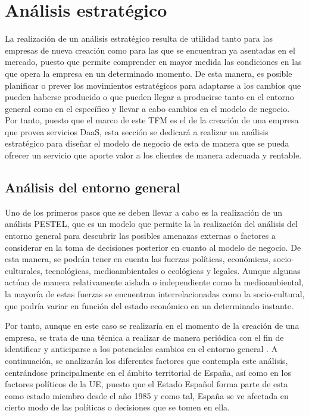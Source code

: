 \clearpage

\section{Análisis estratégico}
La realización de un análisis estratégico resulta de utilidad tanto para las empresas de nueva creación como para las que se encuentran ya asentadas en el mercado, puesto que permite comprender en mayor medida las condiciones en las que opera la empresa en un determinado momento. De esta manera, es posible planificar o prever los movimientos estratégicos para adaptarse a los cambios que pueden haberse producido o que pueden llegar a producirse tanto en el entorno general como en el específico y llevar a cabo cambios en el modelo de negocio. Por tanto, puesto que el marco de este \acs{TFM} es el de la creación de una empresa que provea servicios \acs{DaaS}, esta sección se dedicará a realizar un análisis estratégico para diseñar el modelo de negocio de esta de manera que se pueda ofrecer un servicio que aporte valor a los clientes de manera adecuada y rentable.

\subsection{Análisis del entorno general}
Uno de los primeros pasos que se deben llevar a cabo es la realización de un análisis PESTEL, que es un modelo que permite la la realización del análisis del entorno general para descubrir las posibles amenazas externas o factores a considerar en la toma de decisiones posterior en cuanto al modelo de negocio. De esta manera, se podrán tener en cuenta las fuerzas políticas, económicas, socio-culturales, tecnológicas, medioambientales o ecológicas y legales. Aunque algunas actúan de manera relativamente aislada o independiente como la medioambiental, la mayoría de estas fuerzas se encuentran interrelacionadas como la socio-cultural, que podría variar en función del estado económico en un determinado instante.

Por tanto, aunque en este caso se realizaría en el momento de la creación de una empresa, se trata de una técnica a realizar de manera periódica con el fin de identificar y anticiparse a los potenciales cambios en el entorno general \cite{jedidiagarciallergo2012}. A continuación, se analizarán los diferentes factores que contempla este análisis, centrándose principalmente en el ámbito territorial de España, así como en los factores políticos de la \acf{UE}, puesto que el Estado Español forma parte de esta como estado miembro desde el año 1985 y como tal, España se ve afectada en cierto modo de las políticas o decisiones que se tomen en ella. 

